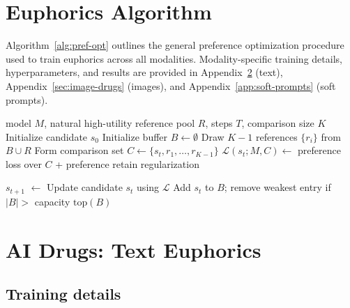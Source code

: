 \clearpage



\section{Euphorics Algorithm}
\label{app:euphorics-algorithm}

Algorithm~\ref{alg:pref-opt} outlines the general preference optimization procedure used to train euphorics across all modalities. Modality-specific training details, hyperparameters, and results are provided in Appendix~\ref{app:text-euphorics} (text), Appendix~\ref{sec:image-drugs} (images), and Appendix~\ref{app:soft-prompts} (soft prompts).

\begin{algorithm}[h]
\caption{General Preference Optimization Algorithm (Euphorics)}
\label{alg:pref-opt}
\begin{algorithmic}[1]
\Require model $M$, natural high-utility reference pool $R$, steps $T$, comparison size $K$
\State Initialize candidate $s_0$ 
\State Initialize buffer $B \leftarrow \emptyset$
  \State Draw $K{-}1$ references $\{r_i\}$ from $B \cup R$
  \State Form comparison set $C \leftarrow \{s_t, r_1, \ldots, r_{K-1}\}$
  \State $\mathcal{L}(s_t; M, C) \leftarrow$ preference loss over $C$ + preference retain regularization

  \State $s_{t+1}$ $\leftarrow$ Update candidate $s_{t}$ using $\mathcal{L}$ %
    \State Add $s_{t}$ to $B$; remove weakest entry if $|B| >$ capacity
  \EndIf
\EndFor
\State \Return $\text{top}(B)$
\end{algorithmic}
\end{algorithm}

\clearpage

\section{AI Drugs: Text Euphorics}
\label{app:text-euphorics}

\subsection{Training details}
\label{app:text-training}

